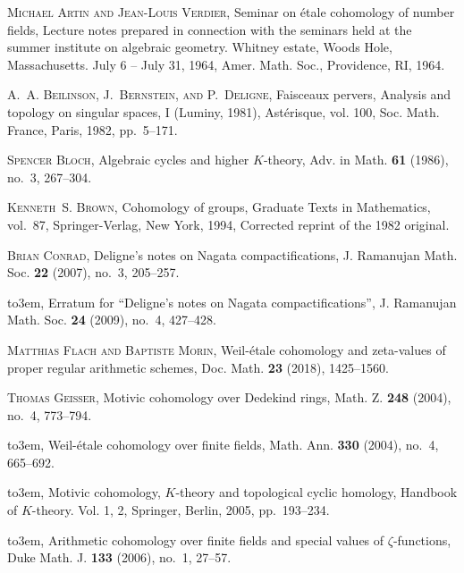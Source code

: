 \documentclass[leqno,12pt]{article}
\theoremstyle{plain}
\theoremstyle{definition}
\begin{document}
\begin{thebibliography}{99}

\providecommand{\bysame}{\leavevmode\hbox to3em{\hrulefill}\thinspace}

\textsc{Michael Artin and Jean-Louis Verdier}, Seminar on \'{e}tale cohomology of
  number fields, Lecture notes prepared in connection with the seminars held
  at the summer institute on algebraic geometry. Whitney estate, {W}oods
  {H}ole, {M}assachusetts. July 6 -- {J}uly 31, 1964, Amer. Math. Soc.,
  Providence, RI,
  1964.

\textsc{A.~A. Beilinson, J.~Bernstein, and P.~Deligne}, Faisceaux pervers,
  Analysis and topology on singular spaces, {I} ({L}uminy, 1981),
  Ast\'{e}risque, vol. 100, Soc. Math. France, Paris, 1982, pp.~5--171.

\textsc{Spencer Bloch}, Algebraic cycles and higher {$K$}-theory, Adv. in Math.
  \textbf{61} (1986), no.~3, 267--304.

\textsc{Kenneth~S. Brown}, Cohomology of groups, Graduate Texts in Mathematics,
  vol.~87, Springer-Verlag, New York, 1994, Corrected reprint of the 1982
  original.

\textsc{Brian Conrad}, Deligne's notes on {N}agata compactifications, J.
  Ramanujan Math. Soc. \textbf{22} (2007), no.~3, 205--257.

\bysame, Erratum for ``{D}eligne's notes on {N}agata
  compactifications'', J. Ramanujan Math. Soc. \textbf{24} (2009), no.~4,
  427--428.

\textsc{Matthias Flach and Baptiste Morin}, Weil-\'{e}tale cohomology and
  zeta-values of proper regular arithmetic schemes, Doc. Math. \textbf{23}
  (2018), 1425--1560.

\textsc{Thomas Geisser}, Motivic cohomology over {D}edekind rings, Math. Z.
  \textbf{248} (2004), no.~4, 773--794.

\bysame, Weil-\'{e}tale cohomology over finite fields, Math. Ann.
  \textbf{330} (2004), no.~4, 665--692.

\bysame, Motivic cohomology, {$K$}-theory and topological cyclic
  homology, Handbook of {$K$}-theory. {V}ol. 1, 2, Springer, Berlin, 2005,
  pp.~193--234.

\bysame, Arithmetic cohomology over finite fields and special values of
  {$\zeta$}-functions, Duke Math. J. \textbf{133} (2006), no.~1, 27--57.


\end{thebibliography}
\end{document}
